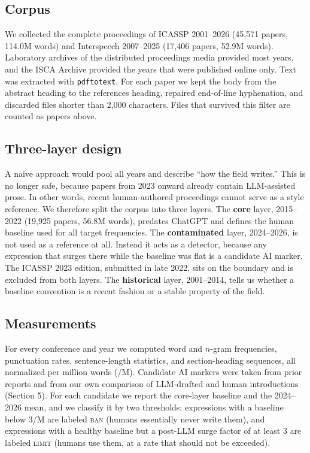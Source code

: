 \documentclass[a4paper,10pt,twocolumn]{article}
\begin{document}
\subsection{Corpus}

We collected the complete proceedings of ICASSP 2001--2026 (45{,}571 papers, 114.0M words) and Interspeech 2007--2025 (17{,}406 papers, 52.9M words). Laboratory archives of the distributed proceedings media provided most years, and the ISCA Archive provided the years that were published online only. Text was extracted with \texttt{pdftotext}. For each paper we kept the body from the abstract heading to the references heading, repaired end-of-line hyphenation, and discarded files shorter than 2{,}000 characters. Files that survived this filter are counted as papers above.

\subsection{Three-layer design}

A naive approach would pool all years and describe ``how the field writes.'' This is no longer safe, because papers from 2023 onward already contain LLM-assisted prose. In other words, recent human-authored proceedings cannot serve as a style reference. We therefore split the corpus into three layers. The \textbf{core} layer, 2015--2022 (19{,}925 papers, 56.8M words), predates ChatGPT and defines the human baseline used for all target frequencies. The \textbf{contaminated} layer, 2024--2026, is not used as a reference at all. Instead it acts as a detector, because any expression that surges there while the baseline was flat is a candidate AI marker. The ICASSP 2023 edition, submitted in late 2022, sits on the boundary and is excluded from both layers. The \textbf{historical} layer, 2001--2014, tells us whether a baseline convention is a recent fashion or a stable property of the field.

\subsection{Measurements}

For every conference and year we computed word and $n$-gram frequencies, punctuation rates, sentence-length statistics, and section-heading sequences, all normalized per million words (/M). Candidate AI markers were taken from prior reports \cite{kobak2024,juzek2025} and from our own comparison of LLM-drafted and human introductions (Section 5). For each candidate we report the core-layer baseline and the 2024--2026 mean, and we classify it by two thresholds: expressions with a baseline below 3/M are labeled \textsc{ban} (humans essentially never write them), and expressions with a healthy baseline but a post-LLM surge factor of at least 3 are labeled \textsc{limit} (humans use them, at a rate that should not be exceeded).
\end{document}
